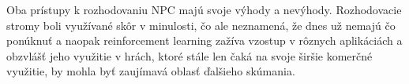 \documentclass[slovak, master]{diploma}
\begin{document}
Oba prístupy k rozhodovaniu NPC majú svoje výhody a nevýhody. Rozhodovacie stromy boli využívané skôr v minulosti, čo ale neznamená, že dnes už nemajú čo ponúknuť a naopak reinforcement learning zažíva vzostup v rôznych aplikáciách a obzvlášť jeho využitie v hrách, ktoré stále len čaká na svoje širšie komerčné využitie, by mohla byť zaujímavá oblasť ďalšieho skúmania.

\printbibliography[title={Literatúra}, heading=bibintoc]

\appendix

\end{document}

